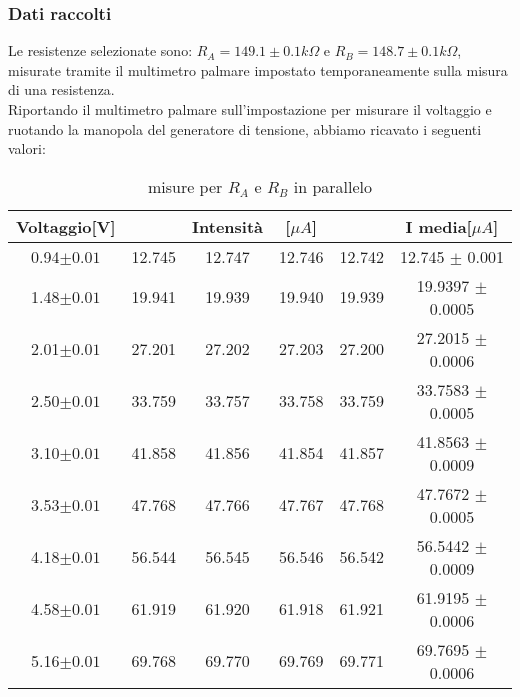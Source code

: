\documentclass[a4paper]{article}
\theoremstyle{definition}
\begin{document}
\subsubsection*{Dati raccolti}

Le resistenze selezionate sono: \(R_{A} = 149.1 \pm 0.1 k\Omega\) e \(R_{B} = 148.7 \pm 0.1 k\Omega\), misurate tramite il multimetro palmare impostato temporaneamente sulla misura di una resistenza.\\

\noindent Riportando il multimetro palmare sull'impostazione per misurare il voltaggio e ruotando la manopola del generatore di tensione, abbiamo ricavato i seguenti valori:

\begin{table}[!htbp]
\centering
    \captionsetup{labelformat=empty}
        \caption{misure per \(R_{A}\) e \(R_{B}\) in parallelo}
    \begin{tabular}{c|cccc|c}
        Voltaggio[V] & & Intensità & [$\mu A$] & & I media[$\mu A$]\\
        \hline
        \hline
        0.94\(\pm 0.01\) & 12.745& 12.747& 12.746& 12.742& 12.745 \(\pm\) 0.001\\
        1.48\(\pm 0.01\) & 19.941& 19.939& 19.940& 19.939 & 19.9397 \(\pm\) 0.0005\\
        2.01\(\pm 0.01\)& 27.201& 27.202& 27.203& 27.200 & 27.2015 \(\pm\) 0.0006\\
        2.50\(\pm 0.01\)& 33.759& 33.757& 33.758& 33.759 & 33.7583 \(\pm\) 0.0005\\
        3.10\(\pm 0.01\)& 41.858& 41.856& 41.854& 41.857 & 41.8563 \(\pm\) 0.0009\\
        3.53\(\pm 0.01\)& 47.768& 47.766& 47.767& 47.768 & 47.7672 \(\pm\) 0.0005\\
        4.18\(\pm 0.01\)& 56.544& 56.545& 56.546& 56.542 & 56.5442 \(\pm\) 0.0009\\
        4.58\(\pm 0.01\)& 61.919& 61.920& 61.918& 61.921 & 61.9195 \(\pm\) 0.0006\\
        5.16\(\pm 0.01\)& 69.768& 69.770& 69.769& 69.771 & 69.7695 \(\pm\) 0.0006\\
        
        \hline
        \hline
    \end{tabular}
    	
\end{table}
\end{document}
